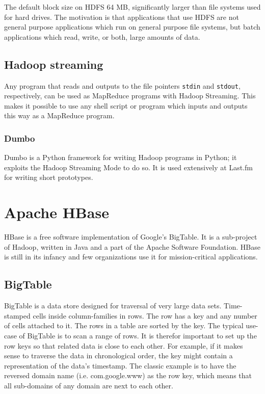 The default block size on HDFS 64 MB, significantly larger than
file systems used for hard drives. The motivation is that applications
that use HDFS are not general purpose applications which run on general
purpose file systems, but batch applications which read, write, or both,
large amounts of data.


\subsection*{Hadoop streaming}

Any program that reads and outputs to the file pointers \texttt{stdin} and
\texttt{stdout}, respectively, can be used as MapReduce programs with
Hadoop Streaming. This makes it possible to use any shell script or
program which inputs and outputs this way as a MapReduce program.


\subsubsection*{Dumbo}

Dumbo is a Python framework for writing Hadoop programs in Python; it exploits
the Hadoop Streaming Mode to do so. It is used extensively at Last.fm for
writing short prototypes. \cite{dumbo}


\section{Apache HBase}

HBase is a free software implementation of Google's BigTable. \cite{bigtable} It
is a sub-project of Hadoop, written in Java and a part of the Apache Software
Foundation. HBase is still in its infancy and few organizations use it for
mission-critical applications. \cite{hbase}


\subsection{BigTable}

BigTable is a data store designed for traversal of very large data sets.
Time-stamped cells inside column-families in rows. The row has a key and any
number of cells attached to it. The rows in a table are sorted by the key.
The typical use-case of BigTable is to scan a range of rows. It is therefor
important to set up the row keys so that related data is close to each other.
For example, if it makes sense to traverse the data in chronological order, the
key might contain a representation of the data's timestamp. The classic example
is to have the reversed domain name (i.e. com.google.www) as the row key, which
means that all sub-domains of any domain are next to each other.


